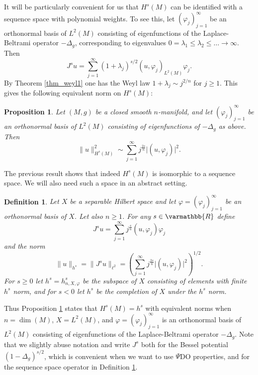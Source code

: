 \documentclass[12pt,twoside]{amsart}
\numberwithin{equation}{section}
\renewcommand{\leq}{\leqslant}
\renewcommand{\geq}{\geqslant}
\renewcommand{\mathbb}{\varmathbb}
\newtheorem{proposition}[theorem]{Proposition}
\newtheorem{definition}[theorem]{Definition}
\newcommand{\mR}{\mathbb{R}}                    %
\newcommand{\abs}[1]{\lvert #1 \rvert}          %
\newcommand{\norm}[1]{\lVert #1 \rVert}         %
\begin{document}
It will be particularly convenient for us that $H^s(M)$ can be identified with a sequence space with polynomial weights. To see this, let $(\varphi_j)_{j=1}^{\infty}$ be an orthonormal basis of $L^2(M)$ consisting of eigenfunctions of the Laplace-Beltrami operator $-\Delta_g$, corresponding to eigenvalues $0 = \lambda_1 \leq \lambda_2 \leq \ldots \to \infty$. Then 
\[
J^s u = \sum_{j=1}^{\infty} (1+\lambda_j)^{s/2} (u, \varphi_j)_{L^2(M)} \varphi_j.
\]
By Theorem \ref{thm_weyl1} one has the Weyl law $1 + \lambda_j \sim j^{2/n}$ for $j \geq 1$. This gives the following equivalent norm on $H^s(M)$:

\begin{proposition} \label{prop_sobolev_sequence_space}
Let $(M,g)$ be a closed smooth $n$-manifold, and let $(\varphi_j)_{j=1}^{\infty}$ be an orthonormal basis of $L^2(M)$ consisting of eigenfunctions of $-\Delta_g$ as above. Then 
\[
\norm{u}_{H^s(M)}^{2} \sim \sum_{j=1}^{\infty} j^{\frac{2s}{n}} \abs{(u,\varphi_j)}^2.
\]
\end{proposition}

The previous result shows that indeed $H^s(M)$ is isomorphic to a sequence space. We will also need such a space in an abstract setting.

\begin{definition} \label{def_hs_sequence}
Let $X$ be a separable Hilbert space and let $\varphi = (\varphi_j)_{j=1}^{\infty}$ be an orthonormal basis of $X$. Let also $n \geq 1$. For any $s \in \mR$ define 
\[
J^s u =  \sum_{j=1}^{\infty} j^{\frac{s}{n}} (u, \varphi_j) \varphi_j
\]
and the norm 
\[
\norm{u}_{h^s} = \norm{J^s u}_{\ell^2} = \left( \sum_{j=1}^{\infty} j^{\frac{2s}{n}} \abs{(u, \varphi_j)}^2 \right)^{1/2}.
\]
For $s \geq 0$ let $h^s = h^s_{n,X,\varphi}$ be the subspace of $X$ consisting of elements with finite $h^s$ norm, and for $s < 0$ let $h^s$ be the completion of $X$ under the $h^s$ norm.
\end{definition}

Thus Proposition \ref{prop_sobolev_sequence_space} states that $H^s(M) = h^s$ with equivalent norms when $n = \dim(M)$, $X = L^2(M)$, and $\varphi = (\varphi_j)_{j=1}^{\infty}$ is an orthonormal basis of $L^2(M)$ consisting of eigenfunctions of the Laplace-Beltrami operator $-\Delta_g$. Note that we slightly abuse notation and write $J^s$ both for the Bessel potential $(1-\Delta_g)^{s/2}$, which is convenient when we want to use $\Psi$DO properties, and for the sequence space operator in Definition \ref{def_hs_sequence}.
\end{document}
